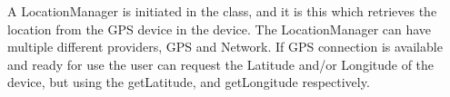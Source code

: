 A LocationManager is initiated in the class, and it is this which retrieves the location from the GPS device in the device. The LocationManager can have multiple different providers, GPS and Network.
If GPS connection is available and ready for use the user can request the Latitude and/or Longitude of the device, but using the getLatitude, and getLongitude respectively.